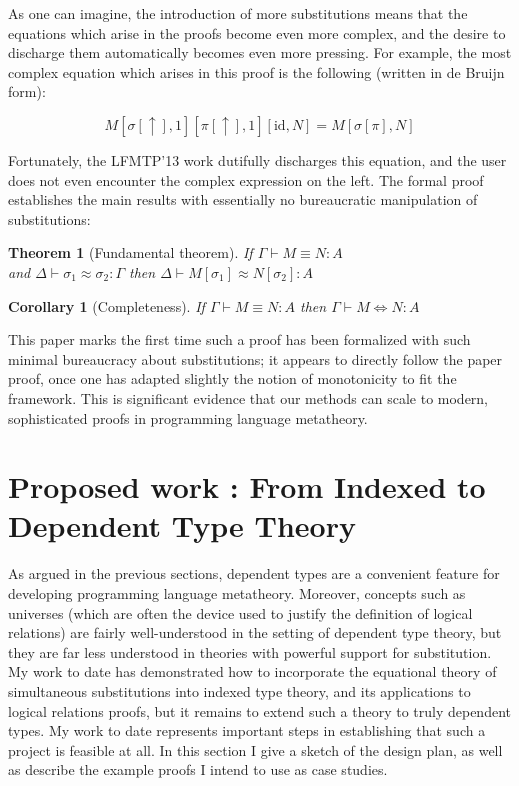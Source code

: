 \documentclass{article}
\newtheorem{theorem}{Theorem}
\newtheorem{corollary}{Corollary}
\begin{document}
As one can imagine, the introduction of more substitutions means that
the equations which arise in the proofs become even more complex, and
the desire to discharge them automatically becomes even more
pressing. For example, the most complex equation which arises in this
proof is the following (written in de Bruijn form):

$$
M[\sigma[\uparrow],1][\pi[\uparrow],1][\text{id}, N] = M[\sigma[\pi],N]
$$

Fortunately, the LFMTP'13 work dutifully discharges this equation, and the user
does not even encounter the complex expression on the left. The formal
proof establishes the main results with essentially no bureaucratic
manipulation of substitutions:

\begin{theorem}[Fundamental theorem]
If $\Gamma \vdash M \equiv N : A$ \\ and $\Delta \vdash \sigma_1 \approx
\sigma_2 : \Gamma$ then $\Delta \vdash M[\sigma_1] \approx
N[\sigma_2] : A$
\end{theorem}

\begin{corollary}[Completeness]
If $\Gamma \vdash M \equiv N : A$ then $\Gamma \vdash M
\Leftrightarrow N : A$
\end{corollary}

This paper marks the first time such a proof has been formalized with
such minimal bureaucracy about substitutions; it appears to directly
follow the paper proof, once one has adapted slightly the notion of
monotonicity to fit the framework. This is significant evidence that
our methods can scale to modern, sophisticated proofs in programming
language metatheory.

\section{Proposed work : From Indexed to Dependent Type Theory}\label{sec:proposed}
As argued in the previous sections, dependent types are a convenient
feature for developing programming language metatheory. Moreover,
concepts such as universes (which are often the device used to justify
the definition of logical relations) are fairly well-understood in the setting of
dependent type theory, but they are far less understood in
theories with powerful support for substitution. My work to date
has demonstrated how to incorporate the equational theory of
simultaneous substitutions into indexed type theory, and its
applications to logical relations proofs, but it remains to extend
such a theory to truly dependent types. My work to date represents
important steps in establishing that such a project is feasible at
all. In this section I give a sketch of the design plan, as well as
describe the example proofs I intend to use as case studies.
\end{document}

